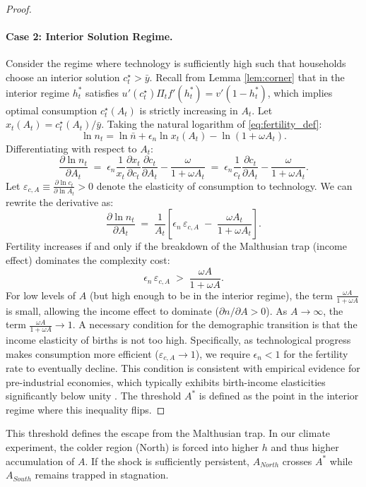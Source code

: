 \documentclass[11pt,a4paper]{article}
\begin{document}
\begin{proof}
  \paragraph{Case 2: Interior Solution Regime.}
  Consider the regime where technology is sufficiently high such that households choose an interior solution \(c_t^\star > \bar{y}\). Recall from Lemma \ref{lem:corner} that in the interior regime \(h_t^*\) satisfies \(u'(c_t^\star)\Pi_t f'(h_t^*)=v'(1-h_t^*)\), which implies optimal consumption \(c_t^\star(A_t)\) is strictly increasing in \(A_t\). Let \(x_t(A_t) = c_t^\star(A_t)/\bar{y}\).
  Taking the natural logarithm of \eqref{eq:fertility_def}:
  \[
    \ln n_t = \ln \bar{n} + \epsilon_n \ln x_t(A_t) - \ln(1 + \omega A_t).
  \]
  Differentiating with respect to \(A_t\):
  \[
    \frac{\partial \ln n_t}{\partial A_t} \;=\; \epsilon_n \frac{1}{x_t} \frac{\partial x_t}{\partial c_t} \frac{\partial c_t}{\partial A_t} - \frac{\omega}{1 + \omega A_t}
    \;=\; \epsilon_n \frac{1}{c_t} \frac{\partial c_t}{\partial A_t} - \frac{\omega}{1 + \omega A_t}.
  \]
  Let \(\varepsilon_{c,A} \equiv \frac{\partial \ln c_t}{\partial \ln A_t} > 0\) denote the elasticity of consumption to technology. We can rewrite the derivative as:
  \[
    \frac{\partial \ln n_t}{\partial A_t} \;=\; \frac{1}{A_t} \left[ \epsilon_n \, \varepsilon_{c,A} \;-\; \frac{\omega A_t}{1 + \omega A_t} \right].
  \]
  Fertility increases if and only if the breakdown of the Malthusian trap (income effect) dominates the complexity cost:
  \[
    \epsilon_n \, \varepsilon_{c,A} \;>\; \frac{\omega A}{1 + \omega A}.
  \]
  For low levels of \(A\) (but high enough to be in the interior regime), the term \(\frac{\omega A}{1+\omega A}\) is small, allowing the income effect to dominate (\(\partial n / \partial A > 0\)). As \(A \to \infty\), the term \(\frac{\omega A}{1+\omega A} \to 1\). A necessary condition for the demographic transition is that the income elasticity of births is not too high. Specifically, as technological progress makes consumption more efficient (\(\varepsilon_{c,A} \to 1\)), we require \(\epsilon_n < 1\) for the fertility rate to eventually decline. This condition is consistent with empirical evidence for pre-industrial economies, which typically exhibits birth-income elasticities significantly below unity \parencite{Clark2008}.
  The threshold \(A^*\) is defined as the point in the interior regime where this inequality flips.
\end{proof}

This threshold defines the escape from the Malthusian trap. In our climate experiment, the colder region (North) is forced into higher \(h\) and thus higher accumulation of \(A\). If the shock is sufficiently persistent, \(A_{North}\) crosses \(A^*\) while \(A_{South}\) remains trapped in stagnation.
\end{document}
